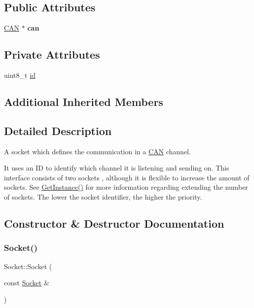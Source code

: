 \subsection*{Public Attributes}
\begin{DoxyCompactItemize}
\item 
\hypertarget{class_socket_ae1c71566dec012f489971541e66646cf}{}\label{class_socket_ae1c71566dec012f489971541e66646cf} 
\hyperlink{class_c_a_n}{C\+AN} $\ast$ {\bfseries can}
\end{DoxyCompactItemize}
\subsection*{Private Attributes}
\begin{DoxyCompactItemize}
\item 
uint8\+\_\+t \hyperlink{class_socket_a1cbe7e5484756b0852a3e2a201341dca}{id}
\end{DoxyCompactItemize}
\subsection*{Additional Inherited Members}


\subsection{Detailed Description}
A socket which defines the communication in a \hyperlink{class_c_a_n}{C\+AN} channel. 

It uses an ID to identify which channel it is listening and sending on. This interface consists of two sockets , although it is flexible to increase the amount of sockets. See \hyperlink{class_socket_abd7d51c20995473a9c9bd6c4e0e5d7c0}{Get\+Instance()} for more information regarding extending the number of sockets. The lower the socket identifier, the higher the priority. 

\subsection{Constructor \& Destructor Documentation}
\hypertarget{class_socket_aae1f09b930bb7118172baa0abb15543e}{}\label{class_socket_aae1f09b930bb7118172baa0abb15543e} 
\subsubsection{\texorpdfstring{Socket()}{Socket()}\hspace{0.1cm}{\footnotesize\ttfamily [1/2]}}
{\footnotesize\ttfamily Socket\+::\+Socket (\begin{DoxyParamCaption}\item[{const \hyperlink{class_socket}{Socket} \&}]{ }\end{DoxyParamCaption})\hspace{0.3cm}{\ttfamily [delete]}}

